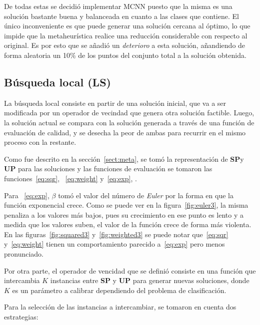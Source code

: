 \documentclass{ci5652}
\begin{document}
De todas estas se decidió implementar MCNN puesto que la misma es una solución bastante buena y balanceada en cuanto a las clases que contiene. El único inconveniente es que puede generar una solución cercana al óptimo, lo que impide que la metaheurística realice una reducción considerable con respecto al original. Es por esto que se añadió un \textit{deterioro} a esta solución, añandiendo de forma aleatoria un 10\% de los puntos del conjunto total a la solución obtenida.
\subsection{Búsqueda local (LS)}\label{sect:ls}

La búsqueda local consiste en partir de una solución inicial, que va a ser modificada por un operador de vecindad que genera otra solución factible. Luego, la solución actual se compara con la solución generada a través de una función de evaluación de calidad, y se desecha la peor de ambas para recurrir en el mismo proceso con la restante.

Como fue descrito en la sección~\ref{sect:meta}, se tomó la representación de \textbf{SP}y \textbf{UP} para las soluciones y las funciones de evaluación se tomaron las funciones~\ref{eq:sqr}, ~\ref{eq:weight} y~\ref{eq:exp}, .

Para ~\ref{eq:exp}, $\beta$ tomó el valor del número de \textit{Euler} por la forma en que la función exponencial crece. Como se puede ver en la figura~\ref{fig:euler3}, la misma penaliza a los valores más bajos, pues su crecimiento en ese punto es lento y a medida que los valores suben, el valor de la función crece de forma más violenta. En las figuras~\ref{fig:squared3} y~\ref{fig:weighted3} se puede notar que~\ref{eq:sqr} y~\ref{eq:weight} tienen un comportamiento parecido a~\ref{eq:exp} pero menos pronunciado.

Por otra parte, el operador de vencidad que se definió consiste en una función que intercambia $K$ instancias entre \textbf{SP} y \textbf{UP} para generar nuevas soluciones, donde $K$ es un parámetro a calibrar dependiendo del problema de clasificación.

Para la selección de las instancias a intercambiar, se tomaron en cuenta dos estrategias:
\end{document}
